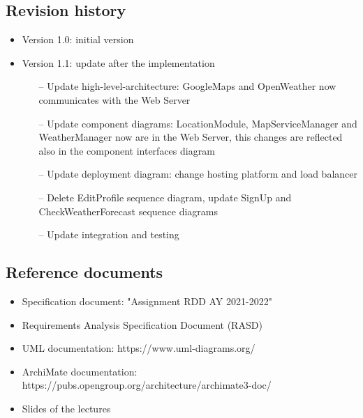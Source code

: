 \documentclass[table, 12pt]{article}
\begin{document}
\subsection{Revision history}
\begin{itemize}
    \item Version 1.0: initial version
    \item Version 1.1: update after the implementation
    \begin{itemize}
        \item[--] Update high-level-architecture: GoogleMaps and OpenWeather now communicates with the Web Server
        \item[--] Update component diagrams: LocationModule, MapServiceManager and WeatherManager now are in the Web Server, this changes are reflected also in the component interfaces diagram
        \item[--] Update deployment diagram: change hosting platform and load balancer
        \item[--] Delete EditProfile sequence diagram, update SignUp and CheckWeatherForecast sequence diagrams
        \item[--] Update integration and testing 
    \end{itemize}
\end{itemize}
\subsection{Reference documents}
\begin{itemize}
    \item Specification document: "Assignment RDD AY 2021-2022"
    \item Requirements Analysis Specification Document (RASD)
    \item UML documentation: https://www.uml-diagrams.org/
    \item ArchiMate documentation: https://pubs.opengroup.org/architecture/archimate3-doc/
    \item Slides of the lectures
\end{itemize}
\end{document}
